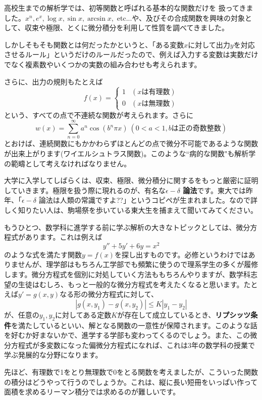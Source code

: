 高校生までの解析学では、初等関数と呼ばれる基本的な関数だけを 扱ってきました。$x^n,e^x,\log x,\sin x,\arcsin x,$ etc...や、及びその合成関数を興味の対象として、収束や極限、とくに微分積分を利用して性質を調べてきました。

しかしそもそも関数とは何だったかというと、「ある変数$x$に対して出力$y$を対応させるルール」というだけのルールだったので、例えば入力する変数は実数だけでなく複素数やいくつかの実数の組み合わせも考えられます。

さらに、出力の規則もたとえば
\begin{equation*}
  f(x) = \begin{cases}
    1 & (xは有理数) \\
    0 & (xは無理数)
  \end{cases}
\end{equation*}
という、すべての点で不連続な関数が考えられます。さらに
\[
　w(x) = \sum_{n=0}^\infty a^n \cos(b^n \pi x) \  (0<a<1,bは正の奇数整数)
\]
とおけば、連続関数にもかかわらずほとんどの点で微分不可能であるような関数が出来上がります(ワイエルシュトラス関数)。このような``病的な関数"も解析学の範疇として考えなければなりません。

大学に入学してしばらくは、収束、極限、微分積分に関するをもっと厳密に証明していきます。極限を扱う際に現れるのが、有名な\textbf{$\epsilon - \delta$ 論法}です。東大では昨年、「$\epsilon - \delta$ 論法は人類の常識ですよ??」というコピペが生まれました。なので詳しく知りたい人は、駒場祭を歩いている東大生を捕まえて聞いてみてください。


もうひとつ、数学科に進学する前に学ぶ解析の大きなトピックとしては、微分方程式があります。これは例えば
\[
y'' + 5y' + 6y = x^2
\]
のような式を満たす関数$y = f(x)$を探し出すものです。必修というわけではありませんが、理学部はもちろん工学部でも頻繁に使うので理系学生の多くが履修します。微分方程式を個別に対処していく方法ももちろんやりますが、数学科志望の生徒はむしろ、もっと一般的な微分方程式を考えたくなると思います。たとえば$y' = g(x,y)$なる形の微分方程式に対して、
\[
|g(x,y_1)-g(x,y_2)| \leq K|y_1 - y_2|
\]
が、任意の$y_1,y_2$に対してある定数$K$が存在して成立しているとき、\textbf{リプシッツ条件}を満たしているといい、解となる関数の一意性が保障されます。このような話を好むか好まないかで、進学する学部も変わってくるのでしょう。また、この微分方程式が多変数になった偏微分方程式になれば、これは3年の数学科の授業で学ぶ発展的な分野になります。

先ほど、有理数で1をとり無理数で0をとる関数を考えましたが、こういった関数の積分はどうやって行うのでしょうか。これは、縦に長い短冊をいっぱい作って面積を求めるリーマン積分では求めるのが難しいです。

